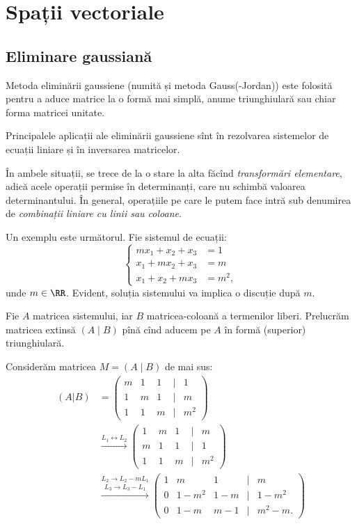 
\chapter{Spații vectoriale}

\section{Eliminare gaussiană}

Metoda eliminării gaussiene (numită și metoda Gauss(-Jordan)) este folosită
pentru a aduce matrice la o formă mai simplă, anume triunghiulară sau chiar
forma matricei unitate.

Principalele aplicații ale eliminării gaussiene sînt în rezolvarea sistemelor
de ecuații liniare și în inversarea matricelor.

În ambele situații, se trece de la o stare la alta făcînd \emph{transformări %
elementare}, adică acele operații permise în determinanți, care nu schimbă
valoarea determinantului. În general, operațiile pe care le putem face intră
sub denumirea de \emph{combinații liniare cu linii sau coloane}.

Un exemplu este următorul. Fie sistemul de ecuații:
\[
    \begin{cases}
        mx_1 + x_2 + x_3 &= 1 \\
        x_1 + mx_2 + x_3 &= m \\
        x_1 + x_2 + mx_3 &= m^2,
    \end{cases}
\]
unde $ m \in \RR $. Evident, soluția sistemului va implica o discuție după $ m $.

Fie $ A $ matricea sistemului, iar $ B $ matricea-coloană a termenilor liberi.
Prelucrăm matricea extinsă $ (A \mid B) $ pînă cînd aducem pe $ A $ în formă
(superior) triunghiulară.

Considerăm matricea $M = (A \mid B) $ de mai sus:
\begin{align*}
    (A | B) &= \begin{pmatrix}
        m & 1 & 1 & \mid & 1 \\
        1 & m & 1 & \mid & m \\
        1 & 1 & m & \mid & m^2
    \end{pmatrix} \\
            &\xrightarrow{L_1 \leftrightarrow L_2}
            \begin{pmatrix}
                1 & m & 1 & \mid & m \\
                m & 1 & 1 & \mid & 1 \\
                1 & 1 & m & \mid & m^2
            \end{pmatrix} \\
  &\stackrel{L_2 \to L_2 - mL_1}{\xrightarrow{L_3 \to L_3 - L_1}}
  \begin{pmatrix}
      1 & m & 1 & \mid & m \\
      0 & 1 - m^2 & 1 - m & \mid & 1 - m^2 \\
      0 & 1 - m & m - 1 & \mid & m^2 - m.
  \end{pmatrix}
\end{align*}

